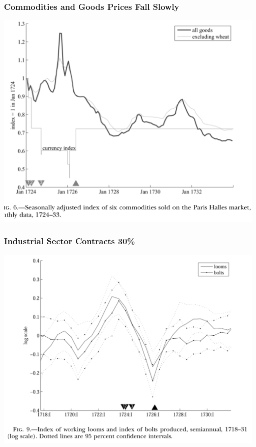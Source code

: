 \documentclass[english,xcolor=svgnames]{beamer}
\begin{document}
\begin{frame}
\frametitle{Commodities and Goods Prices Fall Slowly}
\centering
\includegraphics[scale=0.5]{../../Images/Velde2009commodities.png}	
\end{frame}

\begin{frame}
\frametitle{Industrial Sector Contracts 30\%}
\centering
\includegraphics[scale=0.5]{../../Images/Velde2009textiles.png}	
\end{frame}
\end{document}
